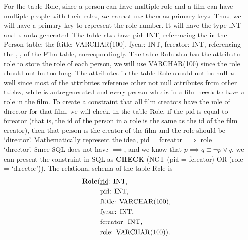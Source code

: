 \documentclass{article}
\newcommand{\key}[1]{\underline{\smash{#1}}}
\begin{document}
For the table Role, since a person can have multiple role and a film can have
multiple people with their roles, we cannot use them as primary keys. Thus, we
will have a primary key \key{rid} to represent the role number. It will have the
type INT and is auto-generated. The table also have pid: INT, referencing the
\key{id} in the Person table; the ftitle: VARCHAR(100), fyear: INT, fcreator:
INT, referencing the \key{title}, \key{year}, \key{creator} of the Film table,
correspondingly. The table Role also has the attribute role to store the role of
each person, we will use VARCHAR(100) since the role should not be too long. The
attributes in the table Role should not be null as well since most of the
attributes reference other not null attributes from other tables, while
\key{rid} is auto-generated and every person who is in a film needs to have a
role in the film. To create a constraint that all film creators have the role of
director for that film, we will check, in the table Role, if the pid is equal to
fcreator (that is, the id of the person in a role is the same as the id of the
film creator), then that person is the creator of the film and the role should
be `director'. Mathematically represent the idea, pid = fcreator $\implies$ role
= `director'. Since SQL does not have $\implies$, and we know that $p \implies q
\equiv \neg p \lor q$, we can present the constraint in SQL as \textbf{CHECK}
(NOT (pid = fcreator) OR (role = `director')). The relational schema of the
table Role is
\begin{align*}
    \text{\textbf{Role}(} & \text{\key{rid}: INT,} \\
                          & \text{pid: INT,} \\
                          & \text{ftitle: VARCHAR(100),} \\
                          & \text{fyear: INT,} \\
                          & \text{fcreator: INT,} \\
                          & \text{role: VARCHAR(100)).} \\
\end{align*}
\end{document}
